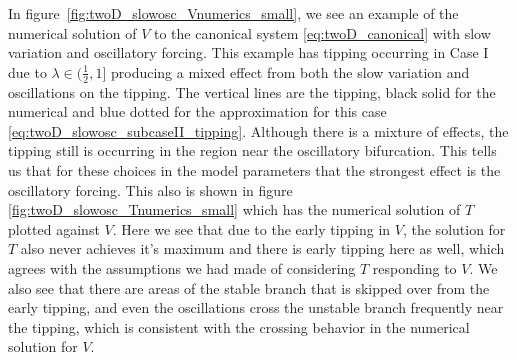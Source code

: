In figure~\ref{fig:twoD_slowosc_Vnumerics_small}, we see an example of the numerical solution of $V$ to the canonical system \eqref{eq:twoD_canonical} with slow variation and oscillatory forcing. This example has tipping occurring in Case I due to $\lambda\in (\frac{1}{2},1]$ producing a mixed effect from both the slow variation and oscillations on the tipping. The vertical lines are the tipping, black solid for the numerical and blue dotted for the approximation for this case \eqref{eq:twoD_slowosc_subcaseII_tipping}. Although there is a mixture of effects, the tipping still is occurring in the region near the oscillatory bifurcation. This tells us that for these choices in the model parameters that the strongest effect is the oscillatory forcing. This also is shown in figure \eqref{fig:twoD_slowosc_Tnumerics_small} which has the numerical solution of $T$ plotted against $V$. Here we see that due to the early tipping in $V$, the solution for $T$ also never achieves it's maximum and there is early tipping here as well, which agrees with the assumptions we had made of considering $T$ responding to $V$. We also see that there are areas of the stable branch that is skipped over from the early tipping, and even the oscillations cross the unstable branch frequently near the tipping, which is consistent with the crossing behavior in the numerical solution for $V$.

